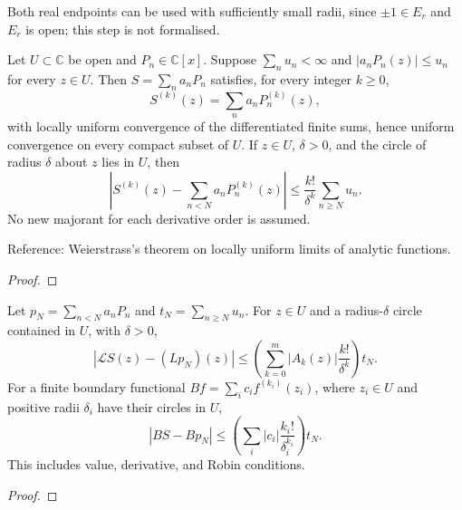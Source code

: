 
Both real endpoints can be used with sufficiently small radii, since
$\pm1\in E_r$ and $E_r$ is open; this step is not formalised.

\begin{supporting}
\begin{theorem}
\label{thm:normal-series-higher-derivatives}
\leanok
Let $U\subset\mathbb C$ be open and $P_n\in\mathbb C[x]$. Suppose
$\sum_n u_n<\infty$ and $|a_nP_n(z)|\le u_n$ for every $z\in U$.
Then $S=\sum_n a_nP_n$ satisfies, for every integer $k\ge0$,
\[
 S^{(k)}(z)=\sum_n a_n P_n^{(k)}(z),
\]
with locally uniform convergence of the differentiated finite sums, hence
uniform convergence on every compact subset of $U$. If $z\in U$, $\delta>0$,
and the circle of radius $\delta$ about $z$ lies in $U$, then
\[
 \left|S^{(k)}(z)-\sum_{n<N}a_nP_n^{(k)}(z)\right|
 \le\frac{k!}{\delta^k}\sum_{n\ge N}u_n.
\]
No new majorant for each derivative order is assumed.

Reference: Weierstrass's theorem on locally uniform limits of analytic functions.
\end{theorem}
\begin{proof}
\leanok
\end{proof}

\begin{theorem}
\label{thm:series-residual-boundary-errors}
\leanok
Let $p_N=\sum_{n<N}a_nP_n$ and $t_N=\sum_{n\ge N}u_n$.
For $z\in U$ and a radius-$\delta$ circle contained in $U$, with $\delta>0$,
\[
 |\mathcal LS(z)-(Lp_N)(z)|\le
 \left(\sum_{k=0}^m |A_k(z)|\frac{k!}{\delta^k}\right)t_N.
\]
For a finite boundary functional $Bf=\sum_i c_i f^{(k_i)}(z_i)$, where
$z_i\in U$ and positive radii $\delta_i$ have their circles in $U$,
\[
 |BS-Bp_N|\le\left(\sum_i|c_i|\frac{k_i!}{\delta_i^{k_i}}\right)t_N.
\]
This includes value, derivative, and Robin conditions.
\end{theorem}
\begin{proof}
\leanok
\end{proof}

\end{supporting}

